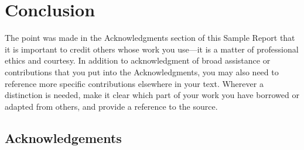 \chapter{Conclusion}\label{Ch:GivingCredit}

The point was made in the Acknowledgments section of this Sample Report that it is important to credit others whose work you use---it is a matter of professional ethics and courtesy. 
In addition to acknowledgment of broad assistance or contributions that you put into the Acknowledgments, you may also need to reference more specific contributions elsewhere in your text.
Wherever a distinction is needed, make it clear which part of your work you have borrowed or adapted from others, and provide a reference to the source. 

\section{Acknowledgements}

\endinput
